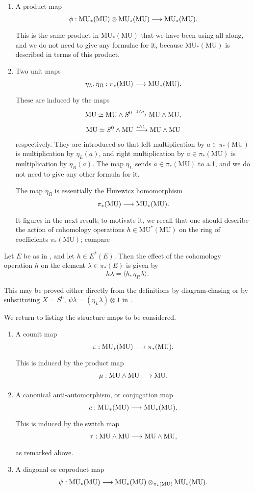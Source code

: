 \documentclass[../main]{subfiles}
\begin{document}
\begin{enumerate}
    \item[(i)] A product map \[\phi : \mathrm{MU}_\ast(\mathrm{MU}) \otimes \mathrm{MU}_\ast(\mathrm{MU}) \lar{} \mathrm{MU}_\ast(\mathrm{MU}).\] This is the same product in $\mathrm{MU}_\ast(\mathrm{MU})$ that we have been using all along, and we do not need to give any formulae for it, because $\mathrm{MU}_\ast(\mathrm{MU})$ is described in terms of this product.
    \item[(ii)] Two unit maps \[\eta_L, \eta_R : \pi_\ast(\mathrm{MU}) \lar{} \mathrm{MU}_\ast(\mathrm{MU}).\] These are induced by the maps 
    \[\mathrm{MU} \simeq \mathrm{MU} \wedge S^0 \lar{1 \wedge i} \mathrm{MU} \wedge \mathrm{MU},\]
    \[\mathrm{MU} \simeq S^0 \wedge \mathrm{MU} \lar{i \wedge 1} \mathrm{MU} \wedge \mathrm{MU}\]
    respectively. They are introduced so that left multiplication by $a \in \pi_\ast(\mathrm{MU})$ is multiplication by $\eta_L(a)$, and right multiplication by $a \in \pi_\ast(\mathrm{MU})$ is multiplication by $\eta_R(a)$. The map $\eta_L$ sends $a \in \pi_\ast(\mathrm{MU})$ to a.1, and we do not need to give any other formula for it.

    The map $\eta_R$ is essentially the Hurewicz homomorphism \[\pi_\ast(\mathrm{MU}) \lar{} \mathrm{MU}_\ast(\mathrm{MU}).\] It figures in the next result; to motivate it, we recall that one should describe the action of cohomology operations $h \in \mathrm{MU}^\ast(\mathrm{MU})$ on the ring of coefficients $\pi_\ast(\mathrm{MU})$; compare \cite[p.~19; Theorem 8.1, p.~23]{adams2}
\end{enumerate}

\begin{proposition}
\label{prop:p2c11.2}
Let $E$ be as in \cite[Lecture 3]{adams3}, and let $h \in E^\ast(E)$. Then the effect of the cohomology operation $h$ on the element $\lambda \in \pi_\ast(E)$ is given by \[h \lambda = \langle h, \eta_R \lambda\rangle.\]
\end{proposition}

This may be proved either directly from the definitions by diagram-chasing or by substituting $X = S^0$, $\psi \lambda = (\eta_L \lambda) \otimes 1$ in \cite[Proposition 2, p.~72]{adams3}.

We return to listing the structure maps to be considered.

\begin{enumerate}
    \item[(iii)] A counit map \[\varepsilon : \mathrm{MU}_\ast(\mathrm{MU}) \lar{} \pi_\ast(\mathrm{MU}).\] This is induced by the product map \[\mu : \mathrm{MU} \wedge \mathrm{MU} \lar{} \mathrm{MU}.\]
    \item[(iv)] A canonical anti-automorphism, or conjugation map \[c : \mathrm{MU}_\ast(\mathrm{MU}) \lar{} \mathrm{MU}_\ast(\mathrm{MU}).\] This is induced by the switch map \[\tau : \mathrm{MU} \wedge \mathrm{MU} \lar{} \mathrm{MU} \wedge \mathrm{MU},\] as remarked above. 
    \item[(v)] A diagonal or coproduct map \[\psi : \mathrm{MU}_\ast(\mathrm{MU}) \lar{} \mathrm{MU}_\ast (\mathrm{MU}) \otimes_{\pi_\ast(\mathrm{MU})} \mathrm{MU}_\ast(\mathrm{MU}).\]
\end{enumerate}
\end{document}

